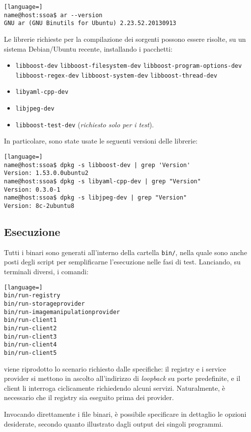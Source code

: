 \documentclass[a4paper,twoside]{article}
\newcommand*\file{\texttt}
\begin{document}
\begin{lstlisting}[language=]
name@host:ssoa$ ar --version 
GNU ar (GNU Binutils for Ubuntu) 2.23.52.20130913
\end{lstlisting}

Le librerie richieste per la compilazione dei sorgenti possono essere risolte, su un sistema Debian/Ubuntu recente, installando i pacchetti:
\begin{itemize}
\item \file{libboost-dev} \file{libboost-filesystem-dev} \file{libboost-program-options-dev} \file{libboost-regex-dev} \file{libboost-system-dev} \file{libboost-thread-dev}
\item \file{libyaml-cpp-dev}
\item \file{libjpeg-dev}
\item \file{libboost-test-dev} (\emph{richiesto solo per i test}).
\end{itemize}

In particolare, sono state usate le seguenti versioni delle librerie:
\begin{lstlisting}[language=]
name@host:ssoa$ dpkg -s libboost-dev | grep 'Version'
Version: 1.53.0.0ubuntu2
name@host:ssoa$ dpkg -s libyaml-cpp-dev | grep "Version"
Version: 0.3.0-1
name@host:ssoa$ dpkg -s libjpeg-dev | grep "Version"
Version: 8c-2ubuntu8
\end{lstlisting}



\subsection{Esecuzione}

Tutti i binari sono generati all'interno della cartella \file{bin/}, nella quale sono anche posti degli script per semplificarne l'esecuzione nelle fasi di test. Lanciando, su terminali diversi, i comandi:
\begin{lstlisting}[language=]
bin/run-registry
bin/run-storageprovider
bin/run-imagemanipulationprovider
bin/run-client1
bin/run-client2
bin/run-client3
bin/run-client4
bin/run-client5
\end{lstlisting}
viene riprodotto lo scenario richiesto dalle specifiche: il registry e i service provider si mettono in ascolto all'indirizzo di \emph{loopback} su porte predefinite, e il client li interroga ciclicamente richiedendo alcuni servizi. Naturalmente, è necessario che il registry sia eseguito prima dei provider.

Invocando direttamente i file binari, è possibile specificare in dettaglio le opzioni desiderate, secondo quanto illustrato dagli output dei singoli programmi.
\end{document}
